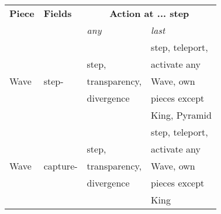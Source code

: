 \begin{table}[!h]
\centering
\begin{tabular}{ llll }
\toprule %
\textbf{Piece}              & \textbf{Fields}           & \multicolumn{2}{c}{ \textbf{Action at ... step} }         \\
                                                        \cmidrule{3-4} %
                            &                           & \emph{any}\footnotemark[1]    & \emph{last}               \\
\midrule %
\multirow{5}{*}{Wave}       & \multirow{5}{*}{step\footnotemark[2]-}
                                                        &                               & step, teleport,           \\
                            &                           & step,                         & activate any              \\
                            &                           & transparency,                 & Wave, own                 \\
                            &                           & divergence\footnotemark[5]    & pieces except             \\
                            &                           &                               & King, Pyramid             \\
\cmidrule{1-4} %
\multirow{5}{*}{Wave}       & \multirow{5}{*}{capture\footnotemark[3]-}
                                                        &                               & step, teleport,           \\
                            &                           & step,                         & activate any              \\
                            &                           & transparency,                 & Wave, own                 \\
                            &                           & divergence\footnotemark[5]    & pieces except             \\
                            &                           &                               & King                      \\

\end{tabular}
\end{table}
